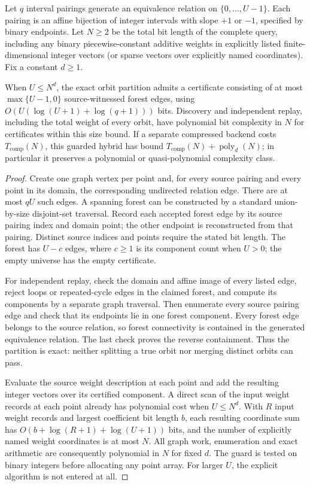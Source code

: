 \begin{proposition}
\label{prop:guarded-expansion}
Let $q$ interval pairings generate an equivalence relation on
$\{0,\ldots,U-1\}$. Each pairing is an affine bijection of integer intervals
with slope $+1$ or $-1$, specified by binary endpoints. Let $N\geq2$ be the
total bit length of the complete query, including any binary piecewise-constant
additive weights in explicitly listed finite-dimensional integer vectors
(or sparse vectors over explicitly named coordinates). Fix a constant $d\geq1$.

When $U\leq N^d$, the exact orbit partition admits a certificate consisting of
at most $\max\{U-1,0\}$ source-witnessed forest edges, using
$O(U(\log(U+1)+\log(q+1)))$ bits. Discovery and independent replay, including
the total weight of every orbit, have polynomial bit complexity in $N$ for
certificates within this size bound. If a separate compressed backend costs
$T_{\mathrm{comp}}(N)$, this guarded hybrid has bound
$T_{\mathrm{comp}}(N)+\operatorname{poly}_d(N)$; in particular it preserves a
polynomial or quasi-polynomial complexity class.
\end{proposition}
\begin{proof}
Create one graph vertex per point and, for every source pairing and every point
in its domain, the corresponding undirected relation edge. There are at most
$qU$ such edges. A spanning forest can be constructed by a standard
union-by-size disjoint-set traversal. Record each accepted forest edge by its
source pairing index and domain point; the other endpoint is reconstructed
from that pairing. Distinct source indices and points require the stated bit
length. The forest has $U-c$ edges, where $c\geq1$ is its component count when
$U>0$; the empty universe has the empty certificate.

For independent replay, check the domain and affine image of every listed
edge, reject loops or repeated-cycle edges in the claimed forest, and compute
its components by a separate graph traversal. Then enumerate every source
pairing edge and check that its endpoints lie in one forest component. Every
forest edge belongs to the source relation, so forest connectivity is contained
in the generated equivalence relation. The last check proves the reverse
containment. Thus the partition is exact: neither splitting a true orbit nor
merging distinct orbits can pass.

Evaluate the source weight description at each point and add the resulting
integer vectors over its certified component. A direct scan of the input
weight records at each point already has polynomial cost when $U\leq N^d$.
With $R$ input weight records and largest coefficient bit length $b$, each
resulting coordinate sum has $O(b+\log(R+1)+\log(U+1))$ bits, and the number of
explicitly named weight coordinates is at most $N$. All graph work, enumeration and exact
arithmetic are consequently polynomial in $N$ for fixed $d$. The guard is
tested on binary integers before allocating any point array. For larger $U$,
the explicit algorithm is not entered at all.
\end{proof}

